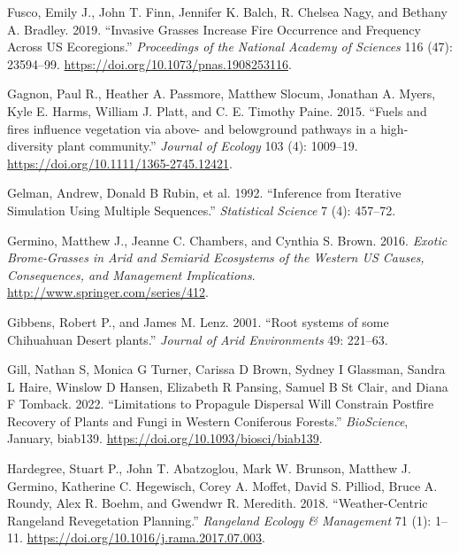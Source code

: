 \documentclass[
  12pt,
]{article}
\newlength{\cslhangindent}
\newlength{\cslentryspacingunit} %
\newenvironment{CSLReferences}[2] %
 {%
  \setlength{\parindent}{0pt}
  \ifodd #1
  \let\oldpar\par
  \def\par{\hangindent=\cslhangindent\oldpar}
  \fi
  \setlength{\parskip}{#2\cslentryspacingunit}
 }%
 {}
\begin{document}
\begin{CSLReferences}{1}{0}
\leavevmode{}%
Fusco, Emily J., John T. Finn, Jennifer K. Balch, R. Chelsea Nagy, and
Bethany A. Bradley. 2019. {``Invasive Grasses Increase Fire Occurrence
and Frequency Across US Ecoregions.''} \emph{Proceedings of the National
Academy of Sciences} 116 (47): 23594--99.
\url{https://doi.org/10.1073/pnas.1908253116}.

\leavevmode{}%
Gagnon, Paul R., Heather A. Passmore, Matthew Slocum, Jonathan A. Myers,
Kyle E. Harms, William J. Platt, and C. E. Timothy Paine. 2015.
{``{Fuels and fires influence vegetation via above- and belowground
pathways in a high-diversity plant community}.''} \emph{Journal of
Ecology} 103 (4): 1009--19.
\url{https://doi.org/10.1111/1365-2745.12421}.

\leavevmode{}%
Gelman, Andrew, Donald B Rubin, et al. 1992. {``Inference from Iterative
Simulation Using Multiple Sequences.''} \emph{Statistical Science} 7
(4): 457--72.

\leavevmode{}%
Germino, Matthew J., Jeanne C. Chambers, and Cynthia S. Brown. 2016.
\emph{{Exotic Brome-Grasses in Arid and Semiarid Ecosystems of the
Western US Causes, Consequences, and Management Implications}}.
\url{http://www.springer.com/series/412}.

\leavevmode{}%
Gibbens, Robert P., and James M. Lenz. 2001. {``{Root systems of some
Chihuahuan Desert plants}.''} \emph{Journal of Arid Environments} 49:
221--63.

\leavevmode{}%
Gill, Nathan S, Monica G Turner, Carissa D Brown, Sydney I Glassman,
Sandra L Haire, Winslow D Hansen, Elizabeth R Pansing, Samuel B St
Clair, and Diana F Tomback. 2022. {``Limitations to {Propagule}
{Dispersal} {Will} {Constrain} {Postfire} {Recovery} of {Plants} and
{Fungi} in {Western} {Coniferous} {Forests}.''} \emph{BioScience},
January, biab139. \url{https://doi.org/10.1093/biosci/biab139}.

\leavevmode{}%
Hardegree, Stuart P., John T. Abatzoglou, Mark W. Brunson, Matthew J.
Germino, Katherine C. Hegewisch, Corey A. Moffet, David S. Pilliod,
Bruce A. Roundy, Alex R. Boehm, and Gwendwr R. Meredith. 2018.
{``Weather-{Centric} {Rangeland} {Revegetation} {Planning}.''}
\emph{Rangeland Ecology \& Management} 71 (1): 1--11.
\url{https://doi.org/10.1016/j.rama.2017.07.003}.


\end{CSLReferences}
\end{document}
